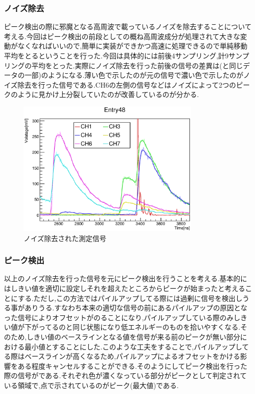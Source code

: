 \subsubsection{ノイズ除去}
ピーク検出の際に邪魔となる高周波で載っているノイズを除去することについて考える.今回はピーク検出の前段としての概ね高周波成分が処理されて大きな変動がなくなればいいので,簡単に実装ができかつ高速に処理できるので単純移動平均をとるということを行った.今回は具体的には前後4サンプリング,計9サンプリングの平均をとった.実際にノイズ除去を行った前後の信号の差異は(と同じデータの一部)のようになる.薄い色で示したのが元の信号で濃い色で示したのがノイズ除去を行った信号である.CH6の左側の信号などはノイズによって2つのピークのように見かけ上分裂していたのが改善しているのが分かる.

\begin{figure}[bht]
  \centering
  \includegraphics[width=0.8\textwidth]{figure/hatano/smoothdata.eps}
  \caption{ノイズ除去された測定信号}
  \label{hatano_fig:smoothdata}
\end{figure}

\subsubsection{ピーク検出}
以上のノイズ除去を行った信号を元にピーク検出を行うことを考える.基本的にはしきい値を適切に設定しそれを超えたところからピークが始まったと考えることにする.ただし,この方法ではパイルアップしてる際には過剰に信号を検出しうる事がありうる.すなわち本来の適切な信号の前にあるパイルアップの原因となった信号によりオフセットがのることになり,パイルアップしている際のみしきい値が下がってるのと同じ状態になり低エネルギーのものを拾いやすくなる.そのため,しきい値のベースラインとなる値を信号が来る前のピークが無い部分における最小値とすることにした.このような工夫をすることで,パイルアップしてる際はベースラインが高くなるため,パイルアップによるオフセットをかける影響をある程度キャンセルすることができる.そのようにしてピーク検出を行った際の信号がである.それぞれ色が濃くなっている部分がピークとして判定されている領域で,点で示されているのがピーク(最大値)である.

